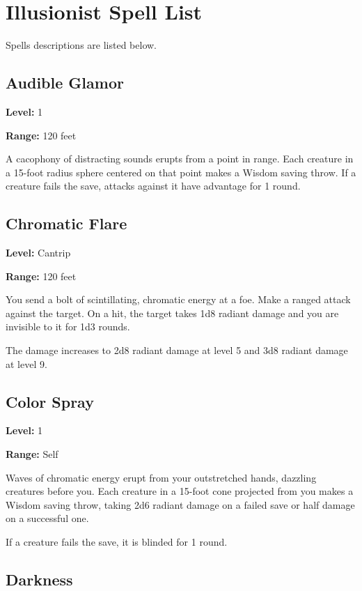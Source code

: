\documentclass[12pt,letterpaper,twocolumn,openany,nodeprecatedcode,bg=none]{dndbook}
\let\oldsubsection\subsection
\renewcommand{\subsection}[1]{%
  \needspace{5\baselineskip}%
  \oldsubsection{#1}%
}
\begin{document}
\newpage

\section{Illusionist Spell List}\label{illusionist-spell-list}

Spells descriptions are listed below.

\subsection{Audible Glamor}\label{audible-glamor}

\textbf{Level:} 1

\textbf{Range:} 120 feet

A cacophony of distracting sounds erupts from a point in range. Each
creature in a 15-foot radius sphere centered on that point makes a
Wisdom saving throw. If a creature fails the save, attacks against it
have advantage for 1 round.

\subsection{Chromatic Flare}\label{chromatic-flare}

\textbf{Level:} Cantrip

\textbf{Range:} 120 feet

You send a bolt of scintillating, chromatic energy at a foe. Make a
ranged attack against the target. On a hit, the target takes 1d8 radiant
damage and you are invisible to it for 1d3 rounds.

The damage increases to 2d8 radiant damage at level 5 and 3d8 radiant
damage at level 9.

\subsection{Color Spray}\label{color-spray}

\textbf{Level:} 1

\textbf{Range:} Self

Waves of chromatic energy erupt from your outstretched hands, dazzling
creatures before you. Each creature in a 15-foot cone projected from you
makes a Wisdom saving throw, taking 2d6 radiant damage on a failed save
or half damage on a successful one.

If a creature fails the save, it is blinded for 1 round.

\subsection{Darkness}\label{darkness}
\end{document}
